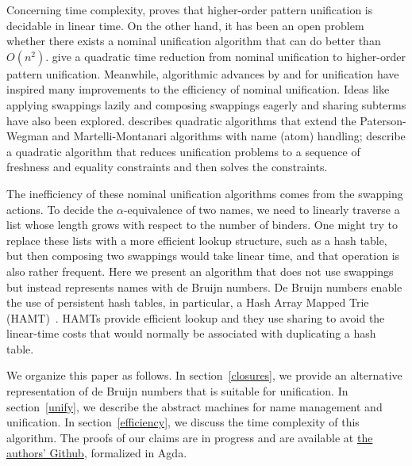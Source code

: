 \documentclass[a4paper,UKenglish]{lipics-v2016}
\begin{document}
Concerning time complexity, \citet{qian_unification_1996} proves that
higher-order pattern unification is decidable in linear time.  On the
other hand, it has been an open problem whether there exists a nominal
unification algorithm that can do better than
$O(n^2)$. \citet{levy_nominal_2012} give a quadratic time reduction
from nominal unification to higher-order pattern unification.
Meanwhile, algorithmic advances by \citet{paterson_linear_1978} and
\citet{martelli_efficient_1982} for unification have inspired many
improvements to the efficiency of nominal unification.  Ideas
like applying swappings lazily and composing swappings eagerly and
sharing subterms have also been explored. \citet{calves_complexity_2010}
describes quadratic algorithms that extend the Paterson-Wegman and
Martelli-Montanari algorithms with name (atom) handling;
\citet{levy_efficient_2010} describe a quadratic algorithm that
reduces unification problems to a sequence of freshness and equality
constraints and then solves the constraints.


The inefficiency of these nominal unification algorithms comes from
the swapping actions. To decide the $\alpha$-equivalence of
two names, we need to linearly traverse a list whose length grows with
respect to the number of binders.  One might try to replace these
lists with a more efficient lookup structure, such as a hash table,
but then composing two swappings would take linear time, and that
operation is also rather frequent.  Here we present an algorithm that
does not use swappings but instead represents names with de Bruijn
numbers. De Bruijn numbers enable the use of persistent hash tables, in
particular, a Hash Array Mapped Trie
(HAMT)~\citep{bagwell_ideal_2001}. HAMTs provide efficient lookup and
they use sharing to avoid the linear-time costs that would normally be
associated with duplicating a hash table.

We organize this paper as follows.  In section~\ref{closures}, we provide
an alternative representation of de Bruijn numbers that is suitable
for unification.  In section~\ref{unify}, we describe the abstract
machines for name management and unification.  In
section~\ref{efficiency}, we discuss the time complexity of this
algorithm. The proofs of our claims are in progress and are available
at \href{https://github.com/mvcccccc/UNIF2018}{the authors' Github},
formalized in Agda.
  
\end{document}
